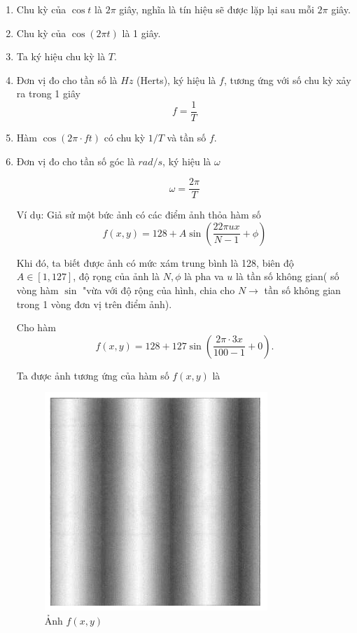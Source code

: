 \documentclass[12pt,a4paper]{report}
\numberwithin{equation}{section}
\theoremstyle{definition} %
\begin{document}
\begin{enumerate}
    \item Chu kỳ của $\cos t$ là $2\pi$ giây, nghĩa là tín hiệu sẽ được lặp lại sau mỗi $2\pi$ giây.

    \item Chu kỳ của $\cos(2\pi t)$ là 1 giây.

\item Ta ký hiệu chu kỳ là $T$.

\item Đơn vị đo cho tần số là $Hz$ (Herts), ký hiệu là $f$, tương ứng với số chu kỳ xảy ra trong 1 giây
$$f=\dfrac{1}{T}$$

\item Hàm $\cos(2\pi \cdot ft)$ có chu kỳ $1/T$ và tần số $f$.

\item Đơn vị đo cho tần số góc là $rad/s$, ký hiệu là $\omega$

$$\omega = \dfrac{2\pi}{T}$$

Ví dụ: Giả sử một bức ảnh có các điểm ảnh thỏa hàm số
$$f(x,y)=128+A \sin \left(\dfrac{22\pi u x}{N-1}+\phi\right)$$

Khi đó, ta biết được ảnh có mức xám trung bình là 128, biên độ $A \in [1,127]$, độ rọng của ảnh là $N, \phi$ là pha va $u$ là tần số không gian( số vòng hàm $\sin $ "vừa với độ rộng của hình, chia cho $N \rightarrow $ tần số không gian trong 1 vòng đơn vị trên  điểm ảnh).

Cho hàm
$$f(x,y)=128+127 \sin \left(\dfrac{2\pi \cdot 3x}{100-1}+0\right).$$

Ta được ảnh tương ứng của hàm số $f(x,y)$ là

\begin{figure}[H]
\label{1.1}
    \centering
\includegraphics[width=0.5\linewidth]{img/Screenshot 2025-10-01 132803.png}
    \caption{Ảnh $f(x,y)$}
\end{figure}

\end{enumerate}
\end{document}
